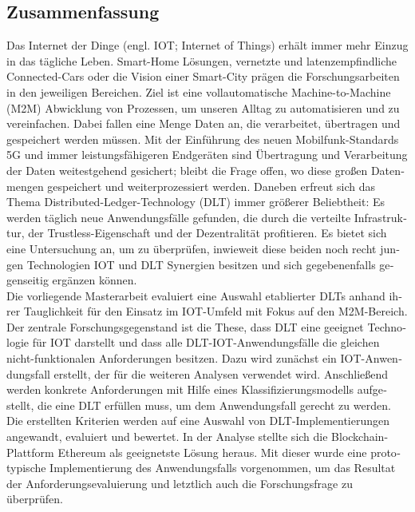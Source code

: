 \begin{otherlanguage}{ngerman}
	\chapter*{Zusammenfassung}
	Das Internet der Dinge (engl. IOT; Internet of Things) erhält immer mehr Einzug in das tägliche Leben. Smart-Home Lösungen, vernetzte und latenzempfindliche Connected-Cars oder die Vision einer Smart-City prägen die Forschungsarbeiten in den jeweiligen Bereichen. Ziel ist eine vollautomatische Machine-to-Machine (M2M) Abwicklung von Prozessen, um unseren Alltag zu automatisieren und zu vereinfachen. Dabei fallen eine Menge Daten an, die verarbeitet, übertragen und gespeichert werden müssen. Mit der Einführung des neuen Mobilfunk-Standards 5G und immer leistungsfähigeren Endgeräten sind Übertragung und Verarbeitung der Daten weitestgehend gesichert; bleibt die Frage offen, wo diese großen Datenmengen gespeichert und weiterprozessiert werden.
	Daneben erfreut sich das Thema Distributed-Ledger-Technology (DLT) immer größerer Beliebtheit: Es werden täglich neue Anwendungsfälle gefunden, die durch die verteilte Infrastruktur, der Trustless-Eigenschaft und der Dezentralität profitieren. Es bietet sich eine Untersuchung an, um zu überprüfen, inwieweit diese beiden noch recht jungen Technologien IOT und DLT Synergien besitzen und sich gegebenenfalls gegenseitig ergänzen können.\\
	Die vorliegende Masterarbeit evaluiert eine Auswahl etablierter DLTs anhand ihrer Tauglichkeit für den Einsatz im IOT-Umfeld mit Fokus auf den M2M-Bereich. Der zentrale Forschungsgegenstand ist die These, dass DLT eine geeignet Technologie für IOT darstellt und dass alle DLT-IOT-Anwendungsfälle die gleichen nicht-funktionalen Anforderungen besitzen. Dazu wird zunächst ein IOT-Anwendungsfall erstellt, der für die weiteren Analysen verwendet wird. Anschließend werden konkrete Anforderungen mit Hilfe eines Klassifizierungsmodells aufgestellt, die eine DLT erfüllen muss, um dem Anwendungsfall gerecht zu werden. Die erstellten Kriterien werden auf eine Auswahl von DLT-Implementierungen angewandt, evaluiert und bewertet. In der Analyse stellte sich die Blockchain-Plattform Ethereum als geeignetste Lösung heraus. Mit dieser wurde eine prototypische Implementierung des Anwendungsfalls vorgenommen, um das Resultat der Anforderungsevaluierung und letztlich auch die Forschungsfrage zu überprüfen.\\

\end{otherlanguage}
